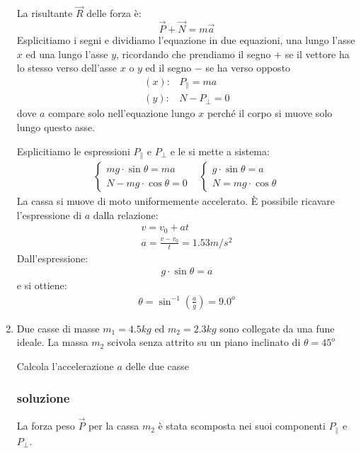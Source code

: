 \documentclass{report}
\begin{document}
\begin{enumerate}
La risultante $\vec{R}$ delle forza è:
\begin{equation*}
  \vec{P}+\vec{N}=m\vec{a}
\end{equation*}
Esplicitiamo i segni e dividiamo l'equazione in due equazioni, una lungo l'asse $x$ ed una lungo l'asse
$y$, ricordando che prendiamo il segno $+$ se il vettore ha lo stesso verso dell'asse $x$ o $y$ ed il
segno $-$ se ha verso opposto
\begin{equation*}
  \begin{matrix}
    (x): & P_\parallel=ma\\
    (y): & N-P_\bot= 0
  \end{matrix}
\end{equation*}
dove $a$ compare solo nell'equazione lungo $x$ perché il corpo si muove solo lungo questo asse.

Esplicitiamo le espressioni $P_\parallel$ e $P_\bot$ e le si mette a sistema:
\begin{eqnarray*}
  \begin{cases}
    mg\cdot \sin\theta=ma\\
    N-mg\cdot\cos\theta=0
  \end{cases} &
                \begin{cases}
                  g\cdot \sin\theta = a\\
                  N=mg\cdot \cos\theta
                \end{cases}
\end{eqnarray*}
La cassa si muove di moto uniformemente accelerato. È possibile ricavare l'espressione di $a$ dalla
relazione:
\begin{eqnarray*}
  v=v_0+at\\
  a=\frac{v-v_0}{t}=1.53m/s^2
\end{eqnarray*}
Dall'espressione:
\begin{eqnarray*}
  g\cdot \sin\theta=a
\end{eqnarray*}
e si ottiene:
\begin{eqnarray*}
  \theta=\sin^{-1}\left(\frac{a}{g}\right)=9.0^o
\end{eqnarray*}
\item Due casse di masse $m_1=4.5kg$ ed $m_2=2.3kg$ sono collegate da una fune ideale. La massa $m_2$
  scivola senza attrito su un piano inclinato di $\theta=45^o$
  \begin{tasks}
    \task Calcola l'accelerazione $a$ delle due casse
  \end{tasks}
  
\subsubsection{soluzione}
\label{sec:sol18}
La forza peso $\vec{P}$ per la cassa $m_2$ è stata scomposta nei suoi componenti $P_\parallel$ e $P_\bot$.


\end{enumerate}
\end{document}
